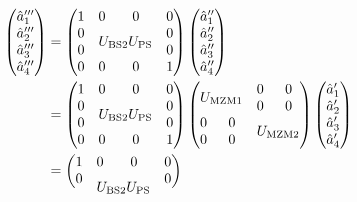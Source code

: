 \begin{equation}
	\begin{split}
		\begin{pmatrix}
			\hat{a}_1^{\prime\prime\prime} \\
			\hat{a}_2^{\prime\prime\prime} \\
			\hat{a}_3^{\prime\prime\prime} \\
			\hat{a}_4^{\prime\prime\prime}
		\end{pmatrix}
		&=
		\begin{pmatrix}
			 1 & 0 & 0 & 0 \\
			 0 & \multicolumn{2}{c}{\multirow{2}{*}{$U_\text{BS2}U_\text{PS}$}} & 0 \\
			 0 & & & 0 \\
			 0 & 0 & 0 & 1
		\end{pmatrix}
		\begin{pmatrix}
			\hat{a}_1^{\prime\prime} \\
			\hat{a}_2^{\prime\prime} \\
			\hat{a}_3^{\prime\prime} \\
			\hat{a}_4^{\prime\prime}
		\end{pmatrix}
		\\
		&=
		\begin{pmatrix}
			 1 & 0 & 0 & 0 \\
			 0 & \multicolumn{2}{c}{\multirow{2}{*}{$U_\text{BS2}U_\text{PS}$}} & 0 \\
			 0 & & & 0 \\
			 0 & 0 & 0 & 1
		\end{pmatrix}
		\begin{pmatrix}
			 \multicolumn{2}{c}{\multirow{2}{*}{$U_\text{MZM1}$}} & 0 & 0 \\
			 & & 0 & 0 \\
			 0 & 0 & \multicolumn{2}{c}{\multirow{2}{*}{$U_\text{MZM2}$}} \\
			 0 & 0 & & \\
		\end{pmatrix}
		\begin{pmatrix}
			\hat{a}_1^\prime \\
			\hat{a}_2^\prime \\
			\hat{a}_3^\prime \\
			\hat{a}_4^\prime
		\end{pmatrix}
		\\
		&=
		\begin{pmatrix}
			 1 & 0 & 0 & 0 \\
			 0 & \multicolumn{2}{c}{\multirow{2}{*}{$U_\text{BS2}U_\text{PS}$}} & 0 \\

\end{pmatrix}
\end{split}
\end{equation}
